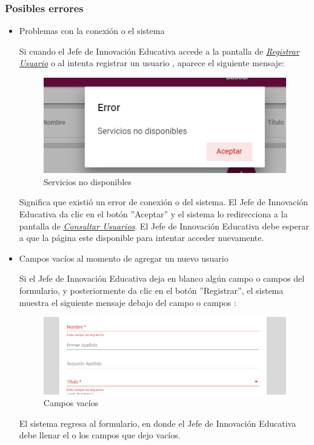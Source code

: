 \subsubsection{Posibles errores}

\begin{itemize}
	\item Problemas con la conexión o el sistema

	Si cuando el Jefe de Innovación Educativa accede a la pantalla de \hyperlink{registrarUs-JIE}{\textit{Registrar Usuario}} o al intenta registrar un usuario , aparece el siguiente mensaje:

	\begin{figure}[H]
		\centering
		\includegraphics[width=0.4\linewidth]{images/SP5/MSGSN}
		\caption{Servicios no disponibles}
		\label{SND-JIE}

	\end{figure}

	Significa que existió un error de conexión o del sistema. El Jefe de Innovación Educativa da clic en el botón ''Aceptar'' y el sistema lo redirecciona  a la pantalla de \hyperlink{consultarUs-JIE}{\textit{Consultar Usuarios}}. El Jefe de Innovación Educativa debe esperar a que la página este disponible para intentar acceder nuevamente.

	\item Campos vacíos al momento de agregar un nuevo usuario

	Si el Jefe de Innovación Educativa deja en blanco algún campo o campos del formulario, y posteriormente da clic en el botón ''Registrar'', el sistema muestra el siguiente mensaje debajo del campo o campos :

	\begin{figure}[H]
		\centering
		\includegraphics[width=0.4\linewidth]{images/SP5/MSG44}
		\caption{Campos vacíos}
		\label{mensaje44-JIE}
	\end{figure}

	El sistema regresa al formulario, en donde el Jefe de Innovación Educativa debe llenar el o los campos que dejo vacíos.


\end{itemize}

